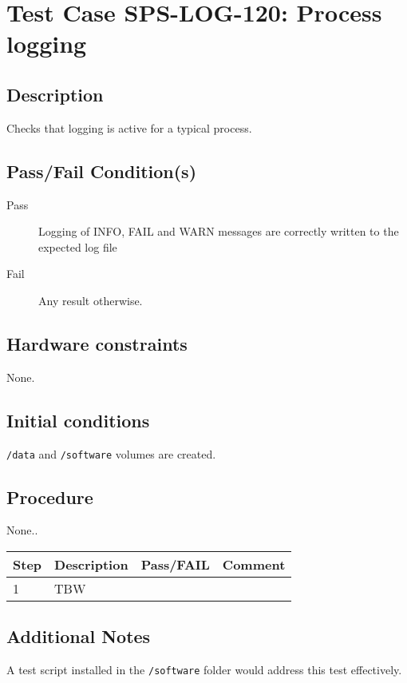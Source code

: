 \section{Test Case SPS-LOG-120: Process logging}

\subsection{Description}

Checks that logging is active for a typical process.

\subsection{Pass/Fail Condition(s)}

\begin{description}
\item [Pass] Logging of INFO, FAIL and WARN messages are correctly written to the expected log file
\item [Fail] Any result otherwise.
\end{description}

\subsection{Hardware constraints}

None.

\subsection{Initial conditions}

\texttt{/data} and \texttt{/software} volumes are created.

\subsection{Procedure}

None..

\begin{table}[H]
    \begin{tabular}{|l| p{5cm} |l| p{5cm} |}
    \hline
    {\bf Step} & {\bf Description} & {\bf Pass/FAIL} & {\bf Comment}  \\ \hline
    1 & TBW &  &  \\ \hline
    \end{tabular}
\end{table}

\subsection{Additional Notes}

A test script installed in the \texttt{/software} folder would address this test effectively.